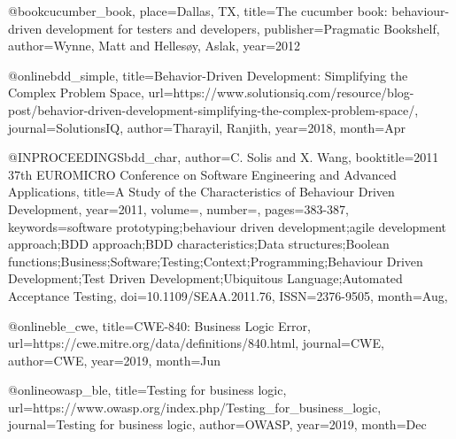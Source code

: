 @book{cucumber_book, place={Dallas, TX}, title={The cucumber book: behaviour-driven development for testers and developers}, publisher={Pragmatic Bookshelf}, author={Wynne, Matt and Hellesøy, Aslak}, year={2012}}

@online{bdd_simple, title={Behavior-Driven Development: Simplifying the Complex Problem Space}, url={https://www.solutionsiq.com/resource/blog-post/behavior-driven-development-simplifying-the-complex-problem-space/}, journal={SolutionsIQ}, author={Tharayil, Ranjith}, year={2018}, month={Apr}}

@INPROCEEDINGS{bdd_char,
author={C. {Solis} and X. {Wang}},
booktitle={2011 37th EUROMICRO Conference on Software Engineering and Advanced Applications},
title={A Study of the Characteristics of Behaviour Driven Development},
year={2011},
volume={},
number={},
pages={383-387},
keywords={software prototyping;behaviour driven development;agile development approach;BDD approach;BDD characteristics;Data structures;Boolean functions;Business;Software;Testing;Context;Programming;Behaviour Driven Development;Test Driven Development;Ubiquitous Language;Automated Acceptance Testing},
doi={10.1109/SEAA.2011.76},
ISSN={2376-9505},
month={Aug},}

@online{ble_cwe, title={CWE-840: Business Logic Error},
url={https://cwe.mitre.org/data/definitions/840.html}, journal={CWE},
author={CWE}, year={2019}, month={Jun}}

@online{owasp_ble,
title={Testing for business logic},
url={https://www.owasp.org/index.php/Testing_for_business_logic},
journal={Testing for business logic},
author={OWASP},
year={2019},
month={Dec}
}